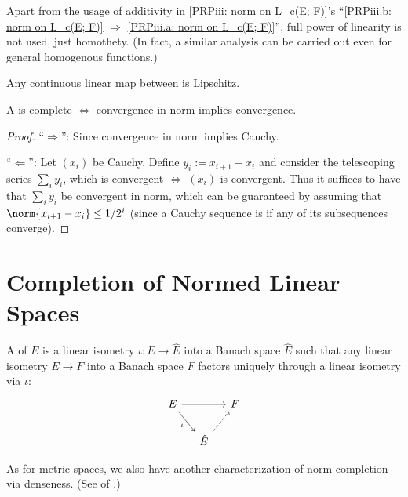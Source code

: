 	\begin{rmk}
		Apart from the usage of additivity in \ref{PRPiii: norm on L_c(E; F)}'s ``\ref{PRPiii.b: norm on L_c(E; F)} $\Rightarrow$ \ref{PRPiii.a: norm on L_c(E; F)}'', full power of linearity is not used, just homothety. (In fact, a similar analysis can be carried out even for general homogenous functions.)
	\end{rmk}
	
	
	\begin{cor}\label{COR: cont lin maps are Lip}
		Any continuous linear map between  is Lipschitz.
	\end{cor}
	
	
	\begin{lem}
	A \NLS is complete $\iff$ convergence in norm implies convergence.
	\end{lem}
	
	\begin{proof}
	``$\Rightarrow$'': Since convergence in norm implies Cauchy.
	
	``$\Leftarrow$'': Let $(x_i)$ be Cauchy. Define $y_i := x_{i + 1} - x_i$ and consider the telescoping series $\sum_i y_i$, which is convergent $\iff$ $(x_i)$ is convergent. Thus it suffices to have that $\sum_i y_i$ be convergent in norm, which can be guaranteed by assuming \wlogg that $\norm{x_{i + 1} - x_i}\le 1/2^i$ (since a Cauchy sequence is \cgt if any of its subsequences converge).
	\end{proof}
	
	
	
	
\section{Completion of Normed Linear Spaces}

	A  of $E$ is a linear isometry $\iota\colon E\to\hat E$ into a Banach space $\hat E$ such that any linear isometry $E\to F$ into a Banach space $F$ factors uniquely through a linear isometry via $\iota$:
	\[
	\begin{tikzcd}[column sep=small]
		E\ar[rr]\ar[dr, "\iota"'] & & F\\
		& \hat E\ar[ur, dashed] &
	\end{tikzcd}
	\]
	
	As for metric spaces, we also have another characterization of norm completion via denseness. (See  of .)
	
